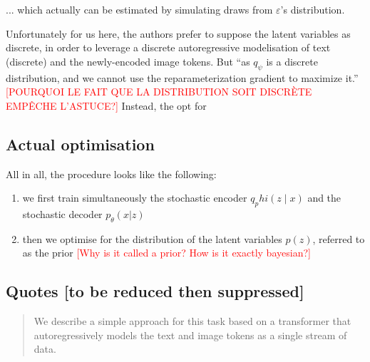 \documentclass{article}
\begin{document}
\begin{appendix}
... which actually can be estimated by simulating draws from $\varepsilon$'s distribution.

Unfortunately for us here, the authors prefer to suppose the latent variables as discrete, in order to leverage a discrete autoregressive modelisation of text (discrete) and the newly-encoded image tokens. But \enquote{as $q_{\psi}$ is a discrete distribution, and we cannot use the reparameterization gradient to maximize it.} \textcolor{red}{[POURQUOI LE FAIT QUE LA DISTRIBUTION SOIT DISCRÈTE EMPÊCHE L'ASTUCE?]} Instead, the opt for 

\subsection{Actual optimisation}

All in all, the procedure looks like the following:
\begin{enumerate}
    \item we first train simultaneously the stochastic encoder $q_phi(z \mid x)$ and the stochastic decoder $p_\theta(x|z)$
    \item then we optimise for the distribution of the latent variables $p(z)$, referred to as the prior \textcolor{red}{[Why is it called a prior? How is it exactly bayesian?]}
\end{enumerate}



\subsection{Quotes [to be reduced then suppressed]}

\blockquote{We describe a simple approach for this task based on a transformer that autoregressively models the text and image tokens as a single stream of data.}


\end{appendix}
\end{document}
